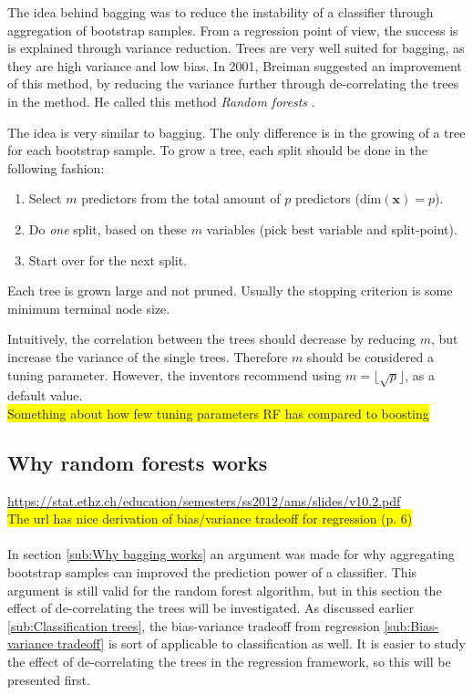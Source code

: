 The idea behind bagging was to reduce the instability of a classifier through aggregation of bootstrap samples. From a regression point of view, the success is is explained through variance reduction. Trees are very well suited for bagging, as they are  high variance and low bias. In 2001, Breiman suggested an improvement of this method, by reducing the variance further through de-correlating the trees in the method. He called this method \textit{Random forests} \cite{randomforests}.

The idea is very similar to bagging. The only difference is in the growing of a tree for each bootstrap sample. To grow a tree, each split should be done in the following fashion:
\begin{enumerate}
  \item Select $m$ predictors from the total amount of $p$ predictors ($\mathrm{dim}(\mathbf{x}) = p$).
  \item Do \textit{one} split, based on these $m$ variables (pick best variable and split-point). 
  \item Start over for the next split.
\end{enumerate}
Each tree is grown large and not pruned. Usually the stopping criterion is some minimum terminal node size.

Intuitively, the correlation between the trees should decrease by reducing $m$, but increase the variance of the single trees. Therefore $m$ should be considered a tuning parameter. However, the inventors recommend using $m = \lfloor \sqrt{p} \rfloor$, as a default value.
\\\colorbox{yellow}{Something about how few tuning parameters RF has compared to boosting}\\

\subsection{Why random forests works}
\label{sub:Why random forests works}
\url{https://stat.ethz.ch/education/semesters/ss2012/ams/slides/v10.2.pdf} \\
\colorbox{yellow}{The url has nice derivation of bias/variance tradeoff for regression (p. 6)}\\
\\
In section \ref{sub:Why bagging works} an argument was made for why aggregating bootstrap samples can improved the prediction power of a classifier. This argument is still valid for the random forest algorithm, but in this section the effect of de-correlating the trees will be investigated. As discussed earlier \ref{sub:Classification trees}, the bias-variance tradeoff from regression \ref{sub:Bias-variance tradeoff} is sort of applicable to classification as well. It is easier to study the effect of de-correlating  the trees in the regression framework, so this will be presented first.

